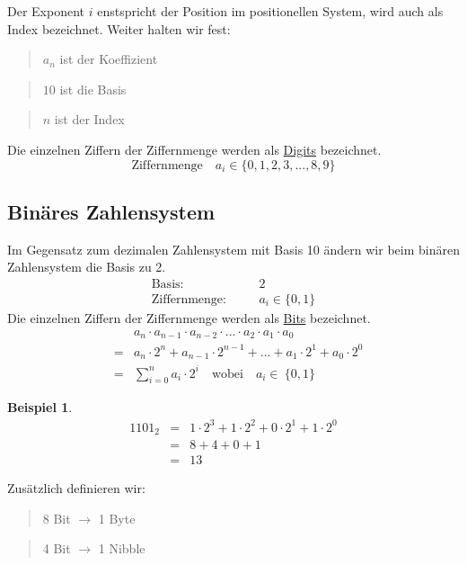 \documentclass{report}
\newtheorem{myexample}{Beispiel}
\begin{document}
Der Exponent $i$ enstspricht der Position im positionellen System, wird auch als Index bezeichnet.
Weiter halten wir fest:
\begin{quote}$a_n$ ist der Koeffizient\end{quote}
\begin{quote}$10$ ist die Basis\end{quote}
\begin{quote}$n$ ist der Index\end{quote}
Die einzelnen Ziffern der Ziffernmenge werden als \underline{Digits} bezeichnet.
\begin{equation}\mbox{Ziffernmenge} \quad a_i \in \{0, 1, 2, 3, ..., 8, 9\}\end{equation}
\subsection{Binäres Zahlensystem}
Im Gegensatz zum dezimalen Zahlensystem mit Basis 10 ändern wir beim binären Zahlensystem die Basis zu 2.
\begin{eqnarray}\mbox{Basis}:&\quad& 2 \nonumber \\
\mbox{Ziffernmenge}:&\quad&a_i \in \{0, 1\}\end{eqnarray}
Die einzelnen Ziffern der Ziffernmenge werden als \underline{Bits} bezeichnet.
\begin{eqnarray}&&a_n \cdot a_{n-1} \cdot a_{n-2} \cdot ... \cdot a_2 \cdot a_1 \cdot a_0 \nonumber \\
&=&a_n \cdot 2^n + a_{n-1} \cdot 2^{n-1} + ... + a_1 \cdot 2^1 + a_0 \cdot 2^0 \nonumber \\
&=&\sum_{i=0}^{n} a_i \cdot 2^i \quad \mbox{wobei}\quad a_i \in\ \{0, 1\}\end{eqnarray}
\begin{myexample}
\begin{eqnarray}1101_2&=&1 \cdot 2^3 + 1 \cdot 2^2 + 0 \cdot 2^1 + 1 \cdot 2^0 \nonumber \\
&=&8 + 4 + 0 + 1 \nonumber \\
&=&13\end{eqnarray}\end{myexample}
Zusätzlich definieren wir:
\begin{quote}8 Bit $\to$ 1 Byte\end{quote}
\begin{quote}4 Bit $\to$ 1 Nibble\end{quote}
\end{document}
